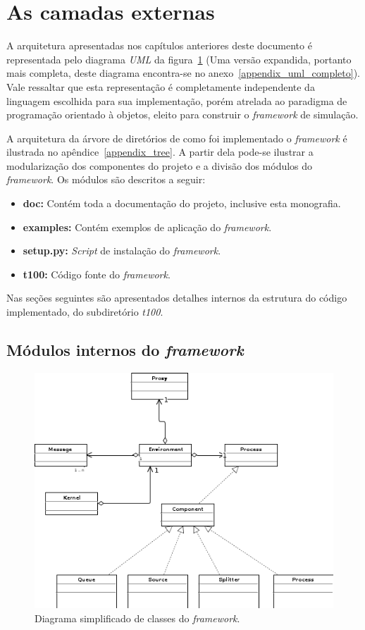 \section{As camadas externas}

A arquitetura apresentadas nos capítulos anteriores deste documento é representada pelo diagrama \textit{UML} da figura~\ref{fig:arquitetura_uml_geral} (Uma versão expandida, portanto mais completa, deste diagrama encontra-se no anexo~\ref{appendix_uml_completo}). Vale ressaltar que esta representação é completamente independente da linguagem escolhida para sua implementação, porém atrelada ao paradigma de programação orientado à objetos, eleito para construir o \textit{framework} de simulação.

A arquitetura da árvore de diretórios de como foi implementado o \textit{framework} é ilustrada no apêndice~\ref{appendix_tree}. A partir dela pode-se ilustrar a modularização dos componentes do projeto e a divisão dos módulos do \textit{framework}. Os módulos são descritos a seguir:

\begin{itemize}
\item \textbf{doc:} Contém toda a documentação do projeto, inclusive esta monografia.
\item \textbf{examples:} Contém exemplos de aplicação do \emph{framework}.
\item \textbf{setup.py:} \emph{Script} de instalação do \textit{framework}.
\item \textbf{t100:} Código fonte do \textit{framework}.
\end{itemize}

Nas seções seguintes são apresentados detalhes internos da estrutura do código implementado, do subdiretório \textit{t100}. 

\subsection{Módulos internos do \emph{framework}}

\begin{figure}
  \centerline{\includegraphics{arquitetura_uml_geral.png}}
  \caption{Diagrama simplificado de classes do \textit{framework}.}
\label{fig:arquitetura_uml_geral}
\end{figure}

